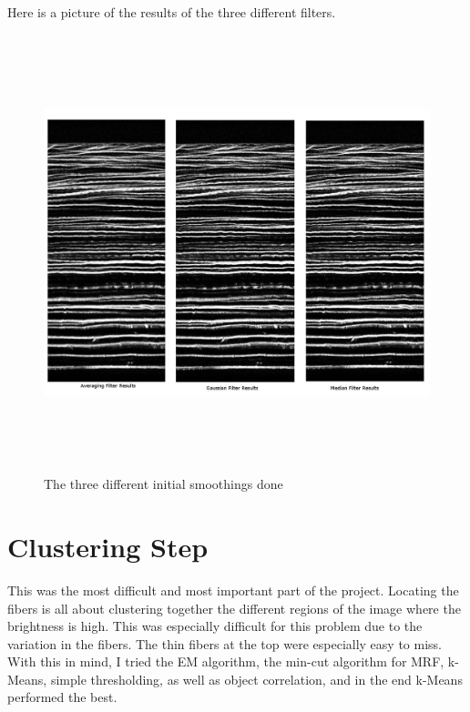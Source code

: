 \documentclass[11pt,psfig]{article}
\begin{document}
Here is a picture of the results of the three different filters.
\begin{figure}[H]
\centering
\includegraphics[height=5in]{initialSmoothComparisonPic.jpg}
\caption{The three different initial smoothings done}
\end{figure}

\section{Clustering Step}

This was the most difficult and most important part of the project. Locating the fibers is all about clustering together the different regions of the image where the brightness is high. This was especially difficult for this problem due to the variation in the fibers. The thin fibers at the top were especially easy to miss. With this in mind, I tried the EM algorithm, the min-cut algorithm for MRF, k-Means, simple thresholding, as well as object correlation, and in the end k-Means performed the best. 
\end{document}

